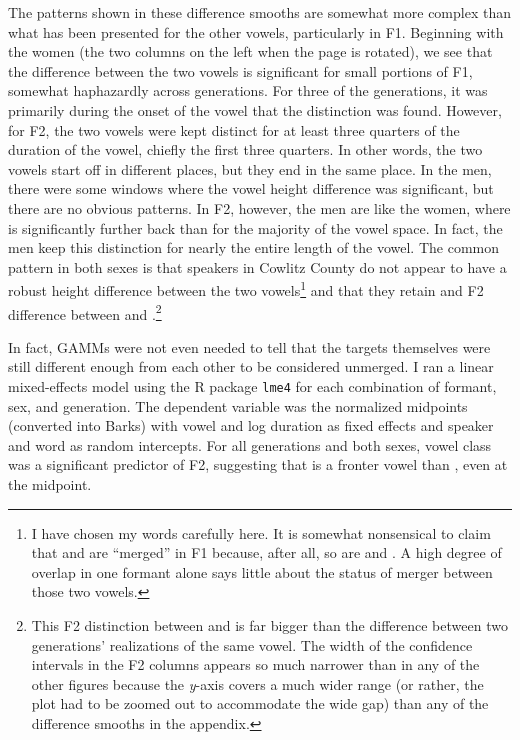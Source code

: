 The patterns shown in these difference smooths are somewhat more complex than what has been presented for the other vowels, particularly in F1. Beginning with the women (the two columns on the left when the page is rotated), we see that the difference between the two vowels is significant for small portions of F1, somewhat haphazardly across generations. For three of the generations, it was primarily during the onset of the vowel that the distinction was found. However, for F2, the two vowels were kept distinct for at least three quarters of the duration of the vowel, chiefly the first three quarters. In other words, the two vowels start off in different places, but they end in the same place. In the men, there were some windows where the vowel height difference was significant, but there are no obvious patterns. In F2, however, the men are like the women, where \thought is significantly further back than \lot for the majority of the vowel space. In fact, the men keep this distinction for nearly the entire length of the vowel. The common pattern in both sexes is that speakers in Cowlitz County do not appear to have a robust height difference between the two vowels\footnote{I have chosen my words carefully here. It is somewhat nonsensical to claim that \lot and \thought are ``merged'' in F1 because, after all, so are \fleece and \goose. A high degree of overlap in one formant alone says little about the status of merger between those two vowels.} and that they retain and F2 difference between \lot and \thought.\footnote{This F2 distinction between \lot and \thought is far bigger than the difference between two generations' realizations of the same vowel. The width of the confidence intervals in the F2 columns appears so much narrower than in any of the other figures because the \textit{y}-axis covers a much wider range (or rather, the plot had to be zoomed out to accommodate the wide gap) than any of the difference smooths in the appendix.}

In fact, GAMMs were not even needed to tell that the targets themselves were still different enough from each other to be considered unmerged. I ran a linear mixed-effects model using the R package \texttt{lme4} \citep{bates_etal_2015_lme4} for each combination of formant, sex, and generation. The dependent variable was the normalized midpoints (converted into Barks) with vowel and log duration as fixed effects and speaker and word as random intercepts. For all generations and both sexes, vowel class was a significant predictor of F2, suggesting that \lot is a fronter vowel than \thought, even at the midpoint.

